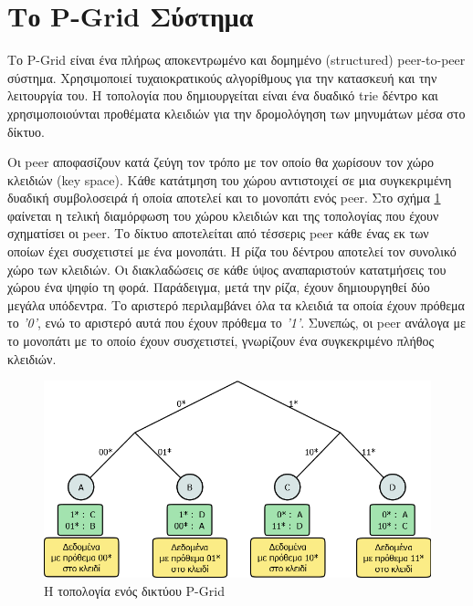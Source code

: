 \section{Το P-Grid Σύστημα}

Το P-Grid 
\citep{Abererb, Aberer, Abererc, Abererd, Aberer2004, Aberer2003, Aberere, Aberer2002} 
είναι ένα πλήρως αποκεντρωμένο και δομημένο 
(structured) peer-to-peer σύστημα. Χρησιμοποιεί τυχαιοκρατικούς 
αλγορίθμους για την κατασκευή και την λειτουργία του. Η τοπολογία που 
δημιουργείται είναι ένα δυαδικό trie δέντρο και χρησιμοποιούνται 
προθέματα κλειδιών για την δρομολόγηση των μηνυμάτων μέσα στο δίκτυο.

Οι peer αποφασίζουν κατά ζεύγη τον τρόπο με τον οποίο θα 
χωρίσουν τον χώρο κλειδιών (key space). Κάθε κατάτμηση του χώρου 
αντιστοιχεί σε μια συγκεκριμένη δυαδική συμβολοσειρά ή οποία αποτελεί 
και το μονοπάτι ενός peer. Στο σχήμα \ref{fig:PGrid_overlay} φαίνεται η τελική 
διαμόρφωση του χώρου κλειδιών και της τοπολογίας που έχουν σχηματίσει οι 
peer. Το δίκτυο αποτελείται από τέσσερις peer κάθε ένας εκ των οποίων 
έχει συσχετιστεί με ένα μονοπάτι. Η ρίζα του δέντρου αποτελεί τον 
συνολικό χώρο των κλειδιών. Οι διακλαδώσεις σε κάθε ύψος αναπαριστούν 
κατατμήσεις του χώρου ένα ψηφίο τη φορά. Παράδειγμα, μετά την ρίζα, 
έχουν δημιουργηθεί δύο μεγάλα υπόδεντρα. Το αριστερό περιλαμβάνει όλα τα 
κλειδιά τα οποία έχουν πρόθεμα το \textit{'0'}, ενώ το αριστερό αυτά που έχουν 
πρόθεμα το \textit{'1'}. Συνεπώς, οι peer ανάλογα με το μονοπάτι με το οποίο 
έχουν συσχετιστεί, γνωρίζουν ένα συγκεκριμένο πλήθος κλειδιών.

\begin{figure}[htbp]
\centering
\includegraphics[scale=0.4]{Figures/P2P_PGrid/PGrid_overlay_network.png}
\caption{Η τοπολογία ενός δικτύου P-Grid}
\label{fig:PGrid_overlay}
\end{figure}

